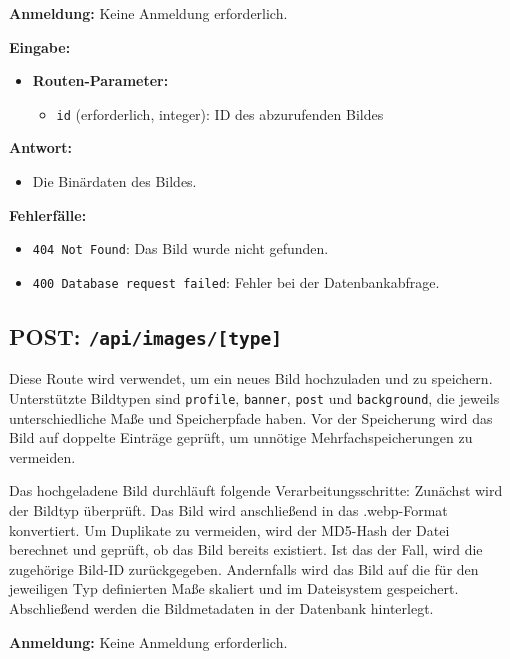\documentclass[a4paper,12pt]{article}
\begin{document}
\textbf{Anmeldung:} Keine Anmeldung erforderlich.

\textbf{Eingabe:}
\begin{itemize}
    \item \textbf{Routen-Parameter:}
    \begin{itemize}
        \item \texttt{id} (erforderlich, integer):
            ID des abzurufenden Bildes
    \end{itemize}
\end{itemize}

\textbf{Antwort:}
\begin{itemize}
    \item Die Binärdaten des Bildes.
\end{itemize}

\textbf{Fehlerfälle:}
\begin{itemize}
    \item \texttt{404 Not Found}:
        Das Bild wurde nicht gefunden.
    \item \texttt{400 Database request failed}:
        Fehler bei der Datenbankabfrage.
\end{itemize}

\newpage
\subsection{POST: \texttt{/api/images/[type]}}

Diese Route wird verwendet, um ein neues Bild hochzuladen und zu speichern.
Unterstützte Bildtypen sind \texttt{profile}, \texttt{banner}, \texttt{post}
und \texttt{background}, die jeweils unterschiedliche Maße und Speicherpfade
haben. Vor der Speicherung wird das Bild auf doppelte Einträge geprüft, um
unnötige Mehrfachspeicherungen zu vermeiden.

Das hochgeladene Bild durchläuft folgende Verarbeitungsschritte: Zunächst wird
der Bildtyp überprüft. Das Bild wird anschließend in das .webp-Format
konvertiert. Um Duplikate zu vermeiden, wird der MD5-Hash der Datei berechnet
und geprüft, ob das Bild bereits existiert. Ist das der Fall, wird die
zugehörige Bild-ID zurückgegeben. Andernfalls wird das Bild auf die für den
jeweiligen Typ definierten Maße skaliert und im Dateisystem gespeichert.
Abschließend werden die Bildmetadaten in der Datenbank hinterlegt.

\textbf{Anmeldung:} Keine Anmeldung erforderlich.
\end{document}
